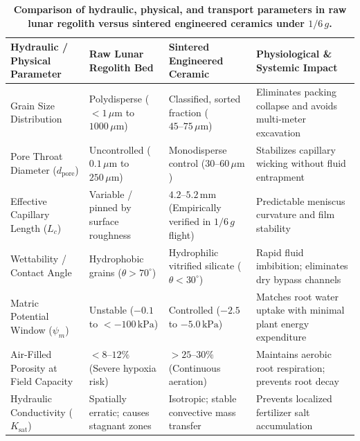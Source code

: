 \begin{table}[t!]
\small
\centering
\caption{\textbf{Comparison of hydraulic, physical, and transport parameters in raw lunar regolith versus sintered engineered ceramics under $1/6\,g$.}}
\label{tab:hydraulic_properties}
\begin{tabularx}{\textwidth}{lXXX}
\toprule
\textbf{Hydraulic / Physical Parameter} & \textbf{Raw Lunar Regolith Bed} & \textbf{Sintered Engineered Ceramic} & \textbf{Physiological \& Systemic Impact} \\
\midrule
Grain Size Distribution & Polydisperse ($<1\,\mu\mathrm{m}$ to $1000\,\mu\mathrm{m}$)\cite{ming1989lunar,krejci2026lunar} & Classified, sorted fraction ($45\text{--}75\,\mu\mathrm{m}$)\cite{ming1989lunar} & Eliminates packing collapse and avoids multi-meter excavation\cite{mckay1991lunar,zhao2023variations} \\
\addlinespace
Pore Throat Diameter ($d_\mathrm{pore}$) & Uncontrolled ($0.1\,\mu\mathrm{m}$ to $250\,\mu\mathrm{m}$)\cite{paul2022plants,ming1989lunar} & Monodisperse control ($30\text{--}60\,\mu\mathrm{m}$)\cite{ming1989lunar} & Stabilizes capillary wicking without fluid entrapment\cite{ming1989lunar} \\
\addlinespace
Effective Capillary Length ($L_c$) & Variable / pinned by surface roughness\cite{hasenstein2026assessing} & $4.2\text{--}5.2\,\mathrm{mm}$ (Empirically verified in $1/6\,g$ flight)\cite{hasenstein2026assessing} & Predictable meniscus curvature and film stability\cite{hasenstein2026assessing} \\
\addlinespace
Wettability / Contact Angle & Hydrophobic grains ($\theta > 70^\circ$)\cite{zhang2025wettability} & Hydrophilic vitrified silicate ($\theta < 30^\circ$)\cite{ming1989lunar} & Rapid fluid imbibition; eliminates dry bypass channels\cite{hasenstein2026assessing} \\
\addlinespace
Matric Potential Window ($\psi_m$) & Unstable ($-0.1$ to $<-100\,\mathrm{kPa}$)\cite{ming1989lunar,hendrix2024reactivity} & Controlled ($-2.5$ to $-5.0\,\mathrm{kPa}$)\cite{ming1989lunar} & Matches root water uptake with minimal plant energy expenditure\cite{ming1989lunar,jones2012beyond} \\
\addlinespace
Air-Filled Porosity at Field Capacity & $<8\text{--}12\%$ (Severe hypoxia risk)\cite{paul2022plants,ming1989lunar,stout2001evidence} & $>25\text{--}30\%$ (Continuous aeration)\cite{ming1989lunar} & Maintains aerobic root respiration; prevents root decay\cite{hasenstein2026assessing,stout2001evidence} \\
\addlinespace
Hydraulic Conductivity ($K_\mathrm{sat}$) & Spatially erratic; causes stagnant zones\cite{paul2022plants,podolsky1994peculiarities} & Isotropic; stable convective mass transfer\cite{ming1989lunar} & Prevents localized fertilizer salt accumulation\cite{ming1989lunar,wamelink2024struvite} \\
\bottomrule
\end{tabularx}
\end{table}
